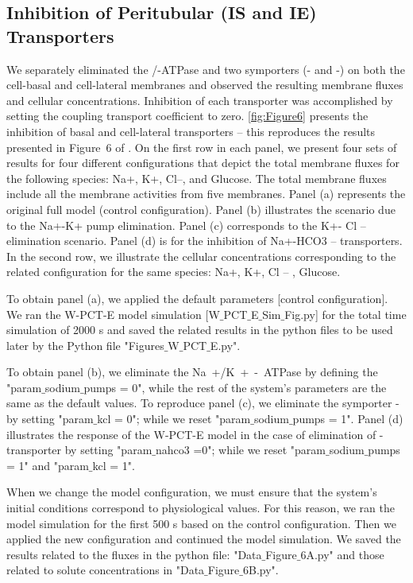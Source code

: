 \documentclass[fleqn,10pt]{physiome}
\begin{document}
\subsection{Inhibition of Peritubular (IS and IE) Transporters}
\label{Inhibition of Peritubular Transporters}
We separately eliminated the /-ATPase and two symporters (- and -) on both the cell-basal and cell-lateral membranes and observed the resulting membrane fluxes and cellular concentrations. Inhibition of each transporter was accomplished by setting the coupling transport coefficient to zero. \autoref{fig:Figure6} presents the inhibition of basal and cell-lateral transporters -- this reproduces the results presented in Figure~6 of \cite{noroozbabaee2022modular}. On the first row in
each panel, we present four sets of results for four different configurations that depict
the total membrane fluxes for the following species: Na+, K+, Cl–, and Glucose. The total
membrane fluxes include all the membrane activities from five membranes. Panel (a) represents the original
full model (control configuration). Panel (b) illustrates the scenario due to the Na+-K+
pump elimination. Panel (c) corresponds to the K+- Cl – elimination scenario. Panel
(d) is for the inhibition of Na+-HCO3 – transporters. In the second row, we illustrate the cellular concentrations corresponding to the related configuration for the same species:
Na+, K+, Cl – , Glucose.

To obtain panel (a), we applied the default parameters [control configuration]. We ran the W-PCT-E model simulation [W$\_$PCT$\_$E$\_$Sim$\_$Fig.py] for the total time simulation of 2000 s and saved the related results in the python files to be used later by the Python file "Figures$\_$W$\_$PCT$\_$E.py".

To obtain panel (b), we eliminate the \si{Na+/K+-ATPase} by defining the "param$\_$sodium$\_$pumps = 0", while the rest of the system's parameters are the same as the default values. To reproduce panel (c), we eliminate the symporter -  by setting "param$\_$kcl = 0";
while we reset "param$\_$sodium$\_$pumps = 1".   Panel (d) illustrates the response of the W-PCT-E model in the case of elimination of - transporter by setting "param$\_$nahco3 =0"; while we reset "param$\_$sodium$\_$pumps = 1" and  "param$\_$kcl = 1". 

When we change the model configuration, we must ensure that the system's initial conditions correspond to physiological values. For this reason, we ran the model simulation for the first 500 s based on the control configuration. Then we applied the new configuration and continued the model simulation. We saved the results related to the fluxes in the python file: "Data$\_$Figure$\_$6A.py" and those related to solute concentrations in "Data$\_$Figure$\_$6B.py".
\end{document}

